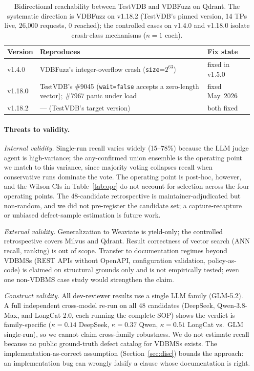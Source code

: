 \documentclass[sigconf]{acmart}
\begin{document}
\begin{table}[t]
\caption{Bidirectional reachability between TestVDB and VDBFuzz on Qdrant. The systematic direction is VDBFuzz on v1.18.2 (TestVDB's pinned version, 14 TPs live, 26{,}000 requests, 0 reached); the controlled cases on v1.4.0 and v1.18.0 isolate crash-class mechanisms ($n{=}1$ each).}
\label{tab:versions}
\small
\begin{tabular}{@{}p{}p{}p{}@{}}
\toprule
Version & Reproduces & Fix state \\
\midrule
v1.4.0 & VDBFuzz's integer-overflow crash (\texttt{size}=$2^{63}$) & fixed in v1.5.0 \\
v1.18.0 & TestVDB's \#9045 (\texttt{wait=false} accepts a zero-length vector); \#7967 panic under load & fixed May~2026 \\
v1.18.2 & --- (TestVDB's target version) & both fixed \\
\bottomrule
\end{tabular}
\end{table}

\paragraph{Threats to validity.}
\emph{Internal validity.} Single-run recall varies widely (15--78\%) because the LLM judge agent is high-variance; the any-confirmed union ensemble is the operating point we match to this variance, since majority voting collapses recall when conservative runs dominate the vote. The operating point is post-hoc, however, and the Wilson CIs in Table~\ref{tab:opr} do not account for selection across the four operating points. The 48-candidate retrospective is maintainer-adjudicated but non-random, and we did not pre-register the candidate set; a capture-recapture or unbiased defect-sample estimation is future work.

\emph{External validity.} Generalization to Weaviate is yield-only; the controlled retrospective covers Milvus and Qdrant. Result correctness of vector search (ANN recall, ranking) is out of scope. Transfer to documentation regimes beyond VDBMSs (REST APIs without OpenAPI, configuration validation, policy-as-code) is claimed on structural grounds only and is not empirically tested; even one non-VDBMS case study would strengthen the claim.

\emph{Construct validity.} All dev-reviewer results use a single LLM family (GLM-5.2). A full independent cross-model re-run on all 48 candidates (DeepSeek, Qwen-3.8-Max, and LongCat-2.0, each running the complete SOP) shows the verdict is family-specific ($\kappa = 0.14$ DeepSeek, $\kappa = 0.37$ Qwen, $\kappa = 0.51$ LongCat vs.\ GLM single-run), so we cannot claim cross-family robustness. We do not estimate recall because no public ground-truth defect catalog for VDBMSs exists. The implementation-as-correct assumption (Section~\ref{sec:disc}) bounds the approach: an implementation bug can wrongly falsify a clause whose documentation is right.
\end{document}
